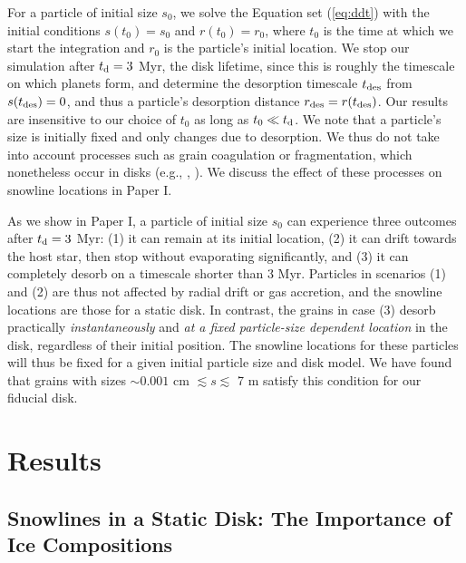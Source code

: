 \documentclass[apj]{emulateapj}
\newcommand{\emgr}[1]{\emph{ \color{gray} #1}}
\begin{document}
For a particle of initial size $s_0$, we solve the Equation set (\ref{eq:ddt}) with the initial conditions $s(t_0)=s_0$ and $r(t_0)=r_0$, where $t_0$ is the time at which we start the integration and $r_0$ is the particle's initial location. We stop our simulation after $t_{\rm d}=3$ Myr, the disk lifetime, since this is roughly the timescale on which planets form, and determine the desorption timescale $t_{\rm des}$ from $s(t_{\rm des})=0$, and thus a particle's desorption distance $r_{\rm des}=r(t_{\rm des})$. Our results are insensitive to our choice of $t_0$ as long as $t_0 \ll t_{\rm d}$. We note that a particle's size is initially fixed and only changes due to desorption. We thus do not take into account processes such as grain coagulation or fragmentation, which nonetheless occur in disks (e.g., \citealt{birnstiel12}, \citealt{perez12}). We discuss the effect of these processes on snowline locations in Paper I.

As we show in Paper I, a particle of initial size $s_0$ can experience three outcomes after $t_{\rm d}=3$ Myr: (1) it can remain at its initial location, (2) it can drift towards the host star, then stop without evaporating significantly, and (3) it can completely desorb on a timescale shorter than 3 Myr. Particles in scenarios (1) and (2) are thus not affected by radial drift or gas accretion, and the snowline locations are those for a static disk. In contrast, the grains in case (3) desorb practically \textit{instantaneously} and \textit{at a fixed particle-size dependent location} in the disk, regardless of their initial position. The snowline locations for these particles will thus be fixed for a given initial particle size and disk model. We have found that grains with sizes $\sim0.001$ cm $\lesssim s \lesssim$ 7 m satisfy this condition for our fiducial disk. 


\section{Results}
\label{sec:results}

\subsection{Snowlines in a Static Disk: The Importance of Ice \textbf{Compositions}}
\label{sec:snowlines}
\end{document}
